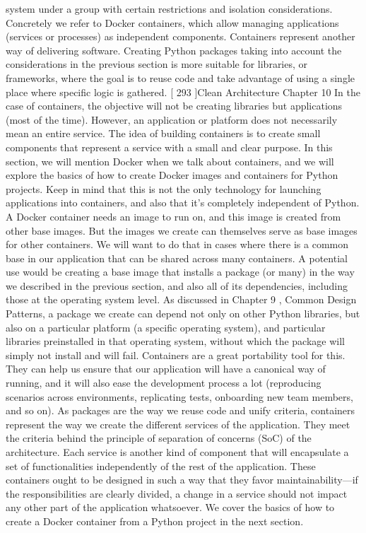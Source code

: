\documentclass[a4paper,10pt,english]{sphinxmanual}
\begin{document}
system under a group with certain restrictions and isolation considerations. Concretely we
refer to Docker containers, which allow managing applications (services or processes) as
independent components.
Containers represent another way of delivering software. Creating Python packages taking
into account the considerations in the previous section is more suitable for libraries, or
frameworks, where the goal is to reuse code and take advantage of using a single place
where specific logic is gathered.
{[} 293 {]}Clean Architecture
Chapter 10
In the case of containers, the objective will not be creating libraries but applications (most of
the time). However, an application or platform does not necessarily mean an entire service.
The idea of building containers is to create small components that represent a service with a
small and clear purpose.
In this section, we will mention Docker when we talk about containers, and we will explore
the basics of how to create Docker images and containers for Python projects. Keep in mind
that this is not the only technology for launching applications into containers, and also that
it’s completely independent of Python.
A Docker container needs an image to run on, and this image is created from other base
images. But the images we create can themselves serve as base images for other containers.
We will want to do that in cases where there is a common base in our application that can
be shared across many containers. A potential use would be creating a base image that
installs a package (or many) in the way we described in the previous section, and also all of
its dependencies, including those at the operating system level. As discussed in Chapter
9 , Common Design Patterns, a package we create can depend not only on other Python
libraries, but also on a particular platform (a specific operating system), and particular
libraries preinstalled in that operating system, without which the package will simply not
install and will fail.
Containers are a great portability tool for this. They can help us ensure that our application
will have a canonical way of running, and it will also ease the development process a lot
(reproducing scenarios across environments, replicating tests, on\sphinxhyphen{}boarding new team
members, and so on).
As packages are the way we reuse code and unify criteria, containers represent the way we
create the different services of the application. They meet the criteria behind the principle of
separation of concerns (SoC) of the architecture. Each service is another kind of component
that will encapsulate a set of functionalities independently of the rest of the application.
These containers ought to be designed in such a way that they favor maintainability—if the
responsibilities are clearly divided, a change in a service should not impact any other part
of the application whatsoever.
We cover the basics of how to create a Docker container from a Python project in the next
section.
\end{document}
